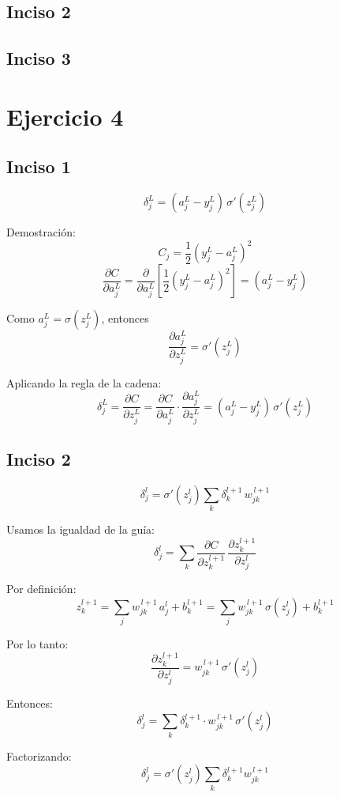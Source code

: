 \documentclass[12pt, a4paper]{article}
\begin{document}
        \subsection*{Inciso 2}
        \subsection*{Inciso 3}
    \section*{Ejercicio 4}
        \subsection*{Inciso 1}
            \[ \delta^L_j = (a^L_j - y^L_j)\,\sigma'(z^L_j) \]

            \noindent Demostración: \[ C_j = \frac12(y^L_j - a^L_j)^2 \] \[ \frac{\partial C}{\partial a^L_j} = \frac{\partial}{\partial a^L_j} \left[\frac{1}{2}(y^L_j - a^L_j)^2 \right] = (a^L_j - y^L_j) \]

            \noindent Como \(a^L_j = \sigma(z^L_j)\), entonces \[ \frac{\partial a^L_j}{\partial z^L_j} = \sigma'(z^L_j) \]

            \noindent Aplicando la regla de la cadena: \[ \delta^L_j = \frac{\partial C}{\partial z^L_j} = \frac{\partial C}{\partial a^L_j} \cdot \frac{\partial a^L_j}{\partial z^L_j} = (a^L_j - y^L_j)\,\sigma'(z^L_j) \]
        \subsection*{Inciso 2}
            \[ \delta^l_j = \sigma'(z^l_j) \sum_k \delta^{l+1}_k\, w^{\,l+1}_{jk} \]

            \noindent Usamos la igualdad de la guía: \[ \delta^l_j = \sum_k \frac{\partial C}{\partial z^{l+1}_k}\, \frac{\partial z^{l+1}_k}{\partial z^l_j} \]

            \noindent Por definición: \[ z^{l+1}_k = \sum_j w^{\,l+1}_{jk}\, a^l_j + b^{l+1}_k = \sum_j w^{\,l+1}_{jk}\, \sigma(z^l_j) + b^{l+1}_k \]

            \noindent Por lo tanto: \[ \frac{\partial z^{l+1}_k}{\partial z^l_j} = w^{\,l+1}_{jk}\,\sigma'(z^l_j) \]

            \noindent Entonces: \[ \delta^l_j = \sum_k \delta^{l+1}_k \cdot w^{\,l+1}_{jk}\, \sigma'(z^l_j) \]

            \noindent Factorizando: \[ \delta^l_j = \sigma'(z^l_j) \sum_k \delta^{l+1}_k w^{\,l+1}_{jk} \]
\end{document}
